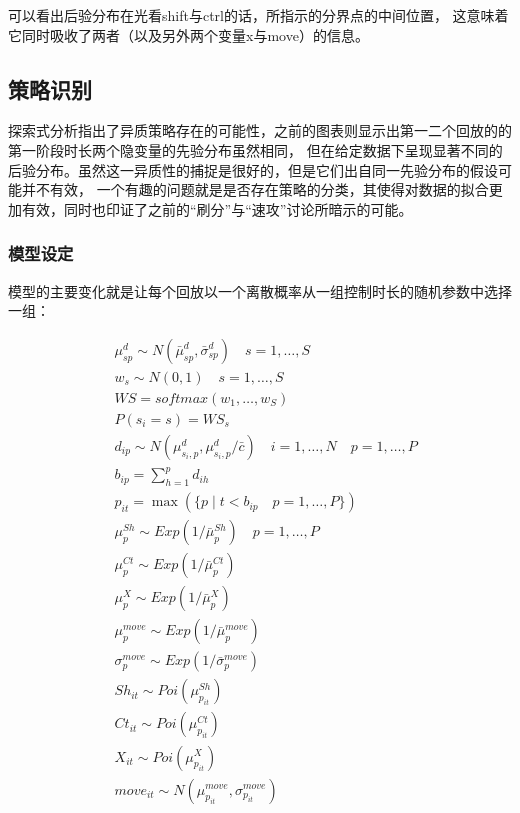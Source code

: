 \documentclass[UTF8]{ctexart}
\begin{document}
可以看出后验分布在光看shift与ctrl的话，所指示的分界点的中间位置，
这意味着它同时吸收了两者（以及另外两个变量x与move）的信息。

\subsection{策略识别}

探索式分析指出了异质策略存在的可能性，之前的图表则显示出第一二个回放的的第一阶段时长两个隐变量的先验分布虽然相同，
但在给定数据下呈现显著不同的后验分布。虽然这一异质性的捕捉是很好的，但是它们出自同一先验分布的假设可能并不有效，
一个有趣的问题就是是否存在策略的分类，其使得对数据的拟合更加有效，同时也印证了之前的“刷分”与“速攻”讨论所暗示的可能。

\subsubsection{模型设定}

模型的主要变化就是让每个回放以一个离散概率从一组控制时长的随机参数中选择一组：

\begin{align*} %
& \mu^d_{sp} \sim N(\bar{\mu}^d_{sp},\bar{\sigma}^d_{sp}) \quad s = 1,\dots,S \\
& w_s \sim N(0,1) \quad s = 1,\dots,S \\
& WS = softmax(w_1,\dots,w_S) \\
& P(s_i=s) = WS_s \\
& d_{ip} \sim N(\mu^d_{s_i,p},\mu^d_{s_i,p} / \bar{c}) \quad i = 1,\dots,N \quad p = 1,\dots,P \\
& b_{ip} = \sum_{h=1}^p d_{ih} \\
& p_{it} = \max( \{ p \mid t < b_{ip} \quad p = 1,\dots,P \} ) \\
& \mu^{Sh}_p \sim Exp(1/\bar{\mu}^{Sh}_p) \quad p = 1,\dots,P \\
& \mu^{Ct}_p \sim Exp(1/\bar{\mu}^{Ct}_p) \\
& \mu^{X}_p \sim Exp(1/\bar{\mu}^{X}_p) \\
& \mu^{move}_p \sim Exp(1/\bar{\mu}^{move}_p) \\
& \sigma^{move}_p \sim Exp(1/\bar{\sigma}^{move}_p) \\
& Sh_{it} \sim Poi(\mu^{Sh}_{p_{it}}) \\
& Ct_{it} \sim Poi(\mu^{Ct}_{p_{it}}) \\
& X_{it} \sim Poi(\mu^{X}_{p_{it}}) \\
& move_{it} \sim N(\mu^{move}_{p_{it}},\sigma^{move}_{p_{it}}) \\
\end{align*}
\end{document}
